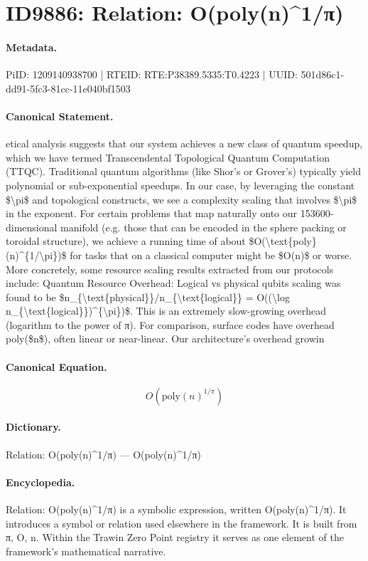 \section*{ID9886: Relation: O(poly(n)\textasciicircum{}1/π)}
\paragraph{Metadata.}
PiID: 1209140938700 | RTEID: RTE:P38389.5335:T0.4223 | UUID: 501d86c1-dd91-5fc3-81cc-11e040bf1503

\paragraph{Canonical Statement.}
etical analysis suggests that our system achieves a new class of quantum speedup, which we have termed Transcendental Topological Quantum Computation (TTQC). Traditional quantum algorithms (like Shor’s or Grover’s) typically yield polynomial or sub-exponential speedups. In our case, by leveraging the constant \$\textbackslash{}pi\$ and topological constructs, we see a complexity scaling that involves \$\textbackslash{}pi\$ in the exponent. For certain problems that map naturally onto our 153600-dimensional manifold (e.g. those that can be encoded in the sphere packing or toroidal structure), we achieve a running time of about \$O(\textbackslash{}text\{poly\}(n)\textasciicircum{}\{1/\textbackslash{}pi\})\$ for tasks that on a classical computer might be \$O(n)\$ or worse. More concretely, some resource scaling results extracted from our protocols include: Quantum Resource Overhead: Logical vs physical qubits scaling was found to be \$n\_\{\textbackslash{}text\{physical\}\}/n\_\{\textbackslash{}text\{logical\}\} = O((\textbackslash{}log n\_\{\textbackslash{}text\{logical\}\})\textasciicircum{}\{\textbackslash{}pi\})\$. This is an extremely slow-growing overhead (logarithm to the power of π). For comparison, surface codes have overhead poly(\$n\$), often linear or near-linear. Our architecture’s overhead growin

\paragraph{Canonical Equation.}
\[
O(\text{poly}(n)^{1/\pi})
\]

\paragraph{Dictionary.}
Relation: O(poly(n)\textasciicircum{}1/π) — O(poly(n)\textasciicircum{}1/π)

\paragraph{Encyclopedia.}
Relation: O(poly(n)\textasciicircum{}1/π) is a symbolic expression, written O(poly(n)\textasciicircum{}1/π). It introduces a symbol or relation used elsewhere in the framework. It is built from π, O, n. Within the Trawin Zero Point registry it serves as one element of the framework's mathematical narrative.
